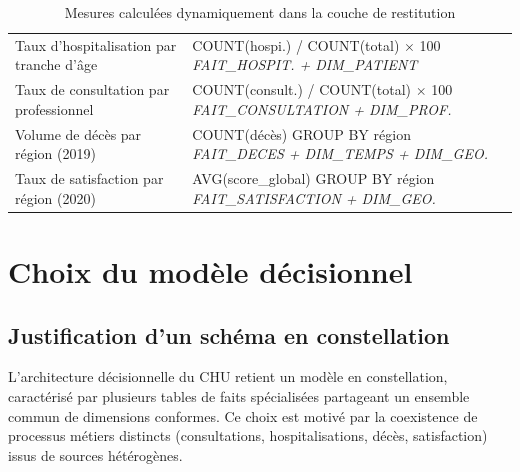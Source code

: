 \documentclass[12pt, a4paper]{report}
\begin{document}
\begin{itemize}[label=\textcolor{chuBlue}{\textbullet}]
\begin{table}[htbp]
\begin{tabularx}{\linewidth}{@{} >{\raggedright\arraybackslash}p{5.5cm}
                                  >{\raggedright\arraybackslash}X @{}}
\rowcolor{chuGray}
Taux d'hospitalisation par tranche d'âge &
COUNT(hospi.) / COUNT(total) $\times$ 100
\newline \textit{FAIT\_HOSPIT. + DIM\_PATIENT} \\

Taux de consultation par professionnel &
COUNT(consult.) / COUNT(total) $\times$ 100
\newline \textit{FAIT\_CONSULTATION + DIM\_PROF.} \\

\rowcolor{chuGray}
Volume de décès par région (2019) &
COUNT(décès) GROUP BY région
\newline \textit{FAIT\_DECES + DIM\_TEMPS + DIM\_GEO.} \\

Taux de satisfaction par région (2020) &
AVG(score\_global) GROUP BY région
\newline \textit{FAIT\_SATISFACTION + DIM\_GEO.} \\

\bottomrule
\end{tabularx}
\caption{Mesures calculées dynamiquement dans la couche de restitution}
\label{tab:kpi_gold}
\end{table}

\clearpage

\section{Choix du modèle décisionnel}

\subsection{Justification d'un schéma en constellation}

L'architecture décisionnelle du CHU retient un modèle en constellation, caractérisé par plusieurs tables de faits spécialisées partageant un ensemble commun de dimensions conformes. Ce choix est motivé par la coexistence de processus métiers distincts (consultations, hospitalisations, décès, satisfaction) issus de sources hétérogènes.


\end{itemize}
\end{document}
